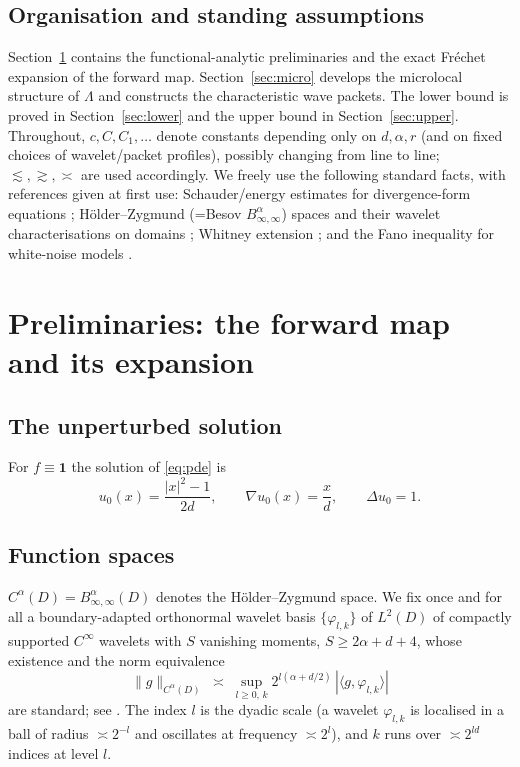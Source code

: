\documentclass[11pt]{amsart}
\newcommand{\1}{\mathbf{1}}
\begin{document}
\subsection{Organisation and standing assumptions}
Section~\ref{sec:prelim} contains the functional-analytic preliminaries and
the exact Fr\'echet expansion of the forward map. Section~\ref{sec:micro}
develops the microlocal structure of $\Lambda$ and constructs the
characteristic wave packets. The lower bound is proved in
Section~\ref{sec:lower} and the upper bound in Section~\ref{sec:upper}.
Throughout, $c,C,C_1,\dots$ denote constants depending only on $d,\alpha,r$
(and on fixed choices of wavelet/packet profiles), possibly changing from
line to line; $\lesssim,\gtrsim,\asymp$ are used accordingly. We freely use
the following standard facts, with references given at first use:
Schauder/energy estimates for divergence-form equations
\cite[Ch.~8]{GT01}; H\"older--Zygmund (=Besov $B^\alpha_{\infty,\infty}$)
spaces and their wavelet characterisations on domains \cite{Tri08,Tri92};
Whitney extension \cite{Ste70}; and the Fano inequality for white-noise
models \cite[Ch.~2]{Tsy09}.

\section{Preliminaries: the forward map and its expansion}
\label{sec:prelim}

\subsection{The unperturbed solution}
For $f\equiv \1$ the solution of \eqref{eq:pde} is
\[
u_0(x)=\frac{|x|^2-1}{2d},\qquad \nabla u_0(x)=\frac{x}{d},\qquad
\Delta u_0=1 .
\]

\subsection{Function spaces}
$C^\alpha(D)=B^\alpha_{\infty,\infty}(D)$ denotes the H\"older--Zygmund
space. We fix once and for all a boundary-adapted orthonormal wavelet basis
$\{\varphi_{l,k}\}$ of $L^2(D)$ of compactly supported $C^\infty$ wavelets
with $S$ vanishing moments, $S\ge 2\alpha+d+4$, whose existence and the
norm equivalence
\begin{equation}\label{eq:wav}
\|g\|_{C^\alpha(D)}\;\asymp\;\sup_{l\ge0,\,k}
2^{l(\alpha+d/2)}\,|\langle g,\varphi_{l,k}\rangle|
\end{equation}
are standard; see \cite[Ch.~2--4]{Tri08}. The index $l$ is the dyadic scale
(a wavelet $\varphi_{l,k}$ is localised in a ball of radius $\asymp 2^{-l}$
and oscillates at frequency $\asymp 2^l$), and $k$ runs over
$\asymp 2^{ld}$ indices at level $l$.
\end{document}
